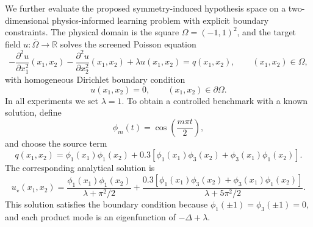 \documentclass[%
 reprint,
 amsmath,amssymb,
 aps,
 pra,
]{revtex4-2}
\theoremstyle{definition}
\begin{document}
We further evaluate the proposed symmetry-induced hypothesis space on a two-dimensional physics-informed learning problem with explicit boundary constraints. The physical domain is the square \(\Omega=(-1,1)^2\), and the target field \(u:\bar{\Omega}\rightarrow\mathbb{R}\) solves the screened Poisson equation
\begin{equation}
    -\frac{\partial^2 u}{\partial x_1^2}(x_1,x_2)
    -\frac{\partial^2 u}{\partial x_2^2}(x_1,x_2)
    +\lambda u(x_1,x_2)
    = q(x_1,x_2),
    \qquad (x_1,x_2)\in\Omega,
\end{equation}
with homogeneous Dirichlet boundary condition
\begin{equation}
    u(x_1,x_2)=0,\qquad (x_1,x_2)\in\partial\Omega.
\end{equation}
In all experiments we set \(\lambda=1\). To obtain a controlled benchmark with a known solution, define
\begin{equation}
    \phi_m(t)=\cos\left(\frac{m\pi t}{2}\right),
\end{equation}
and choose the source term
\begin{equation}
    q(x_1,x_2)=\phi_1(x_1)\phi_1(x_2)
    +0.3\left[\phi_1(x_1)\phi_3(x_2)+\phi_3(x_1)\phi_1(x_2)\right].
\end{equation}
The corresponding analytical solution is
\begin{equation}
    u_\star(x_1,x_2)=
    \frac{\phi_1(x_1)\phi_1(x_2)}{\lambda+\pi^2/2}
    +\frac{0.3\left[\phi_1(x_1)\phi_3(x_2)+\phi_3(x_1)\phi_1(x_2)\right]}{\lambda+5\pi^2/2}.
    \label{eq:screened_poisson_exact_solution}
\end{equation}
This solution satisfies the boundary condition because \(\phi_1(\pm 1)=\phi_3(\pm 1)=0\), and each product mode is an eigenfunction of \(-\Delta+\lambda\).
\end{document}
